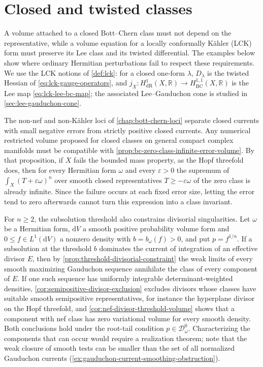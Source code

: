 

\section{Closed and twisted classes}

A volume attached to a closed Bott--Chern class must not depend on the representative, while a volume equation for a locally conformally K\"ahler (LCK) form must preserve its Lee class and its twisted differential. The examples below show where ordinary Hermitian perturbations fail to respect these requirements. We use the LCK notions of \cref{def:lck}: for a closed one-form $\lambda$, $D_\lambda$ is the twisted Hessian of \eqref{eq:lck-gauge-operators}, and $j_X\colon H^1_{\mathrm{dR}}(X,\mathbb R)\to H^{1,1}_{\mathrm{BC}}(X,\mathbb R)$ is the Lee map \eqref{eq:lck-lee-bc-map}; the associated Lee--Gauduchon cone is studied in \cref{sec:lee-gauduchon-cone}.

The non-nef and non-K\"ahler loci of \cref{chap:bott-chern-loci} separate closed currents with small negative errors from strictly positive closed currents. Any numerical restricted volume proposed for closed classes on general compact complex manifolds must be compatible with \cref{prop:bc-zero-class-infinite-error-volume}. By that proposition, if $X$ fails the bounded mass property, as the Hopf threefold does, then for every Hermitian form $\omega$ and every $\varepsilon>0$ the supremum of $\int_X(T+\varepsilon\omega)^n$ over smooth closed representatives $T\geq-\varepsilon\omega$ of the zero class is already infinite. Since the failure occurs at each fixed error size, letting the error tend to zero afterwards cannot turn this expression into a class invariant.

For $n\geq2$, the subsolution threshold also constrains divisorial singularities. Let $\omega$ be a Hermitian form, $\mathrm{d}V$ a smooth positive probability volume form and $0\leq f\in L^1(\mathrm{d}V)$ a nonzero density with $b=b_\omega(f)>0$, and put $p=f^{1/n}$. If a subsolution at the threshold $b$ dominates the current of integration of an effective divisor $E$, then by \cref{prop:threshold-divisorial-constraint} the weak limits of every smooth maximizing Gauduchon sequence annihilate the class of every component of $E$. If one such sequence has uniformly integrable determinant-weighted densities, \cref{cor:semipositive-divisor-exclusion} excludes divisors whose classes have suitable smooth semipositive representatives, for instance the hyperplane divisor on the Hopf threefold, and \cref{cor:nef-divisor-threshold-volume} shows that a component with nef class has zero variational volume for every smooth density. Both conclusions hold under the root-tail condition $p\in\mathcal D_\omega^0$. Characterizing the components that can occur would require a realization theorem; note that the weak closure of smooth tests can be smaller than the set of all normalized Gauduchon currents (\cref{ex:gauduchon-current-smoothing-obstruction}).

